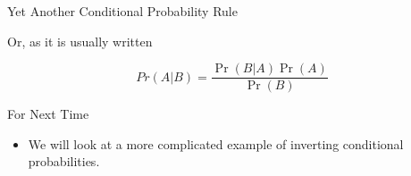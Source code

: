 \documentclass[
  ignorenonframetext,
]{beamer}
\providecommand{\tightlist}{%
  \setlength{\itemsep}{0pt}\setlength{\parskip}{0pt}}
\renewcommand{\,}{\text{, }}
\begin{document}
\begin{frame}{Yet Another Conditional Probability Rule}
\protect\hypertarget{yet-another-conditional-probability-rule-1}{}

Or, as it is usually written

\[
Pr(A | B) = \frac{\Pr(B | A)\Pr(A)}{\Pr(B)}
\]

\end{frame}

\begin{frame}{For Next Time}
\protect\hypertarget{for-next-time}{}

\begin{itemize}
\tightlist
\item
  We will look at a more complicated example of inverting conditional
  probabilities.
\end{itemize}

\end{frame}
\end{document}
